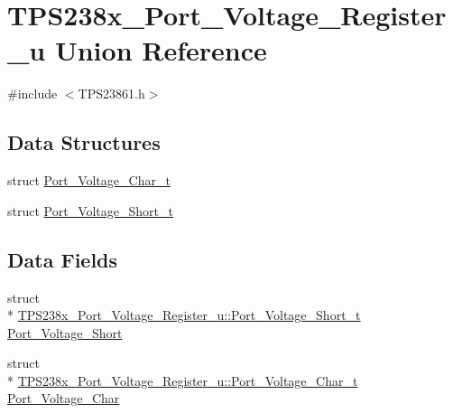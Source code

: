 \hypertarget{union_t_p_s238x___port___voltage___register__u}{\section{T\-P\-S238x\-\_\-\-Port\-\_\-\-Voltage\-\_\-\-Register\-\_\-u Union Reference}
\label{union_t_p_s238x___port___voltage___register__u}
}


{\ttfamily \#include $<$T\-P\-S23861.\-h$>$}

\subsection*{Data Structures}
\begin{DoxyCompactItemize}
\item 
struct \hyperlink{struct_t_p_s238x___port___voltage___register__u_1_1_port___voltage___char__t}{Port\-\_\-\-Voltage\-\_\-\-Char\-\_\-t}
\item 
struct \hyperlink{struct_t_p_s238x___port___voltage___register__u_1_1_port___voltage___short__t}{Port\-\_\-\-Voltage\-\_\-\-Short\-\_\-t}
\end{DoxyCompactItemize}
\subsection*{Data Fields}
\begin{DoxyCompactItemize}
\item 
struct \\*
\hyperlink{struct_t_p_s238x___port___voltage___register__u_1_1_port___voltage___short__t}{T\-P\-S238x\-\_\-\-Port\-\_\-\-Voltage\-\_\-\-Register\-\_\-u\-::\-Port\-\_\-\-Voltage\-\_\-\-Short\-\_\-t} \hyperlink{union_t_p_s238x___port___voltage___register__u_a8c0eeae1c50b8c3360666a533d106f62}{Port\-\_\-\-Voltage\-\_\-\-Short}
\item 
struct \\*
\hyperlink{struct_t_p_s238x___port___voltage___register__u_1_1_port___voltage___char__t}{T\-P\-S238x\-\_\-\-Port\-\_\-\-Voltage\-\_\-\-Register\-\_\-u\-::\-Port\-\_\-\-Voltage\-\_\-\-Char\-\_\-t} \hyperlink{union_t_p_s238x___port___voltage___register__u_ae920d8ac08c3423d500ecf2e4f285b27}{Port\-\_\-\-Voltage\-\_\-\-Char}
\end{DoxyCompactItemize}


